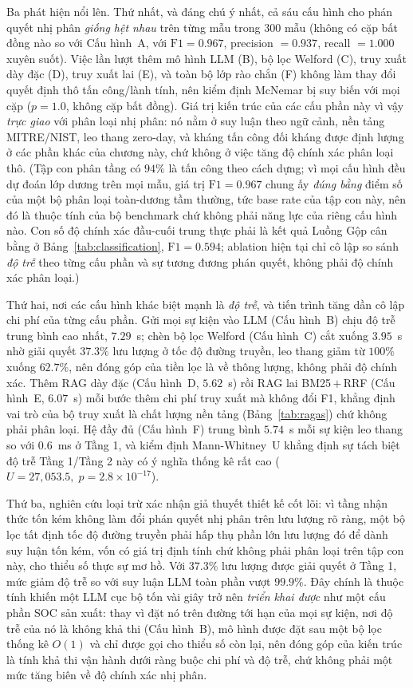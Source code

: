 Ba phát hiện nổi lên. Thứ nhất, và đáng chú ý nhất, cả sáu cấu hình cho phán quyết nhị phân \emph{giống hệt nhau} trên từng mẫu trong 300 mẫu (không có cặp bất đồng nào so với Cấu hình~A, với $\mathrm{F1}=0.967$, precision $=0.937$, recall $=1.000$ xuyên suốt). Việc lần lượt thêm mô hình LLM (B), bộ lọc Welford (C), truy xuất dày đặc (D), truy xuất lai (E), và toàn bộ lớp rào chắn (F) không làm thay đổi quyết định thô tấn công/lành tính, nên kiểm định McNemar bị suy biến với mọi cặp ($p = 1.0$, không cặp bất đồng). Giá trị kiến trúc của các cấu phần này vì vậy \emph{trực giao} với phân loại nhị phân: nó nằm ở suy luận theo ngữ cảnh, nền tảng MITRE/NIST, leo thang zero-day, và kháng tấn công đối kháng được định lượng ở các phần khác của chương này, chứ không ở việc tăng độ chính xác phân loại thô. (Tập con phân tầng có $94\%$ là tấn công theo cách dựng; vì mọi cấu hình đều dự đoán lớp dương trên mọi mẫu, giá trị $\mathrm{F1}=0.967$ chung ấy \emph{đúng bằng} điểm số của một bộ phân loại toàn-dương tầm thường, tức base rate của tập con này, nên đó là thuộc tính của bộ benchmark chứ không phải năng lực của riêng cấu hình nào. Con số độ chính xác đầu-cuối trung thực phải là kết quả Luồng Gộp cân bằng ở Bảng~\ref{tab:classification}, $\mathrm{F1}=0.594$; ablation hiện tại chỉ cô lập so sánh \emph{độ trễ} theo từng cấu phần và sự tương đương phán quyết, không phải độ chính xác phân loại.)

Thứ hai, nơi các cấu hình khác biệt mạnh là \emph{độ trễ}, và tiến trình tăng dần cô lập chi phí của từng cấu phần. Gửi mọi sự kiện vào LLM (Cấu hình~B) chịu độ trễ trung bình cao nhất, $7.29$~s; chèn bộ lọc Welford (Cấu hình~C) cắt xuống $3.95$~s nhờ giải quyết $37.3\%$ lưu lượng ở tốc độ đường truyền, leo thang giảm từ $100\%$ xuống $62.7\%$, nên đóng góp của tiền lọc là về thông lượng, không phải độ chính xác. Thêm RAG dày đặc (Cấu hình~D, $5.62$~s) rồi RAG lai BM25\,$+$\,RRF (Cấu hình~E, $6.07$~s) mỗi bước thêm chi phí truy xuất mà không đổi F1, khẳng định vai trò của bộ truy xuất là chất lượng nền tảng (Bảng~\ref{tab:ragas}) chứ không phải phân loại. Hệ đầy đủ (Cấu hình~F) trung bình $5.74$~s mỗi sự kiện leo thang so với $0.6$~ms ở Tầng 1, và kiểm định Mann-Whitney~U khẳng định sự tách biệt độ trễ Tầng 1/Tầng 2 này có ý nghĩa thống kê rất cao ($U=27{,}053.5,\; p = 2.8\times10^{-17}$).

Thứ ba, nghiên cứu loại trừ xác nhận giả thuyết thiết kế cốt lõi: vì tầng nhận thức tốn kém không làm đổi phán quyết nhị phân trên lưu lượng rõ ràng, một bộ lọc tất định tốc độ đường truyền phải hấp thụ phần lớn lưu lượng đó để dành suy luận tốn kém, vốn có giá trị định tính chứ không phải phân loại trên tập con này, cho thiểu số thực sự mơ hồ. Với $37.3\%$ lưu lượng được giải quyết ở Tầng 1, mức giảm độ trễ so với suy luận LLM toàn phần vượt $99.9\%$. Đây chính là thuộc tính khiến một LLM cục bộ tốn vài giây trở nên \emph{triển khai được} như một cấu phần SOC sản xuất: thay vì đặt nó trên đường tới hạn của mọi sự kiện, nơi độ trễ của nó là không khả thi (Cấu hình~B), mô hình được đặt sau một bộ lọc thống kê $O(1)$ và chỉ được gọi cho thiểu số còn lại, nên đóng góp của kiến trúc là tính khả thi vận hành dưới ràng buộc chi phí và độ trễ, chứ không phải một mức tăng biên về độ chính xác nhị phân.

